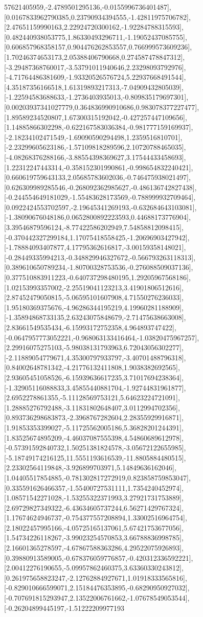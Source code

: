\documentclass{article}
\begin{document}
57621405959,-2.4789501295136,-0.0155996736401487],[0.0167833962790385,0.23790934394555,-1.42811975706782],[2.47651159990163,2.22924720300162,-1.92284788315593],[0.482440938053775,1.86330493296711,-1.19052437085755],[0.606857968358157,0.904476262853557,0.766999573609236],[1.70246374653173,2.05388406790668,0.274587478847312],[-3.29487368760017,-3.53791011940646,2.23298093792976],[-4.71764486381609,-1.93320526576724,5.22937668491544],[4.35187356166518,1.61319893217313,-7.04909432805039],[-1.22594583688633,-1.2736403935013,-0.809835179697301],[0.00203937341027779,0.364836990910686,0.983078377227477],[1.89589234520807,1.67300315192042,-0.427257447109656],[1.14885866302298,-0.622167583036384,-0.981777159169937],[-2.18234102471549,-1.69090590294498,1.2359516810701],[-2.23299605623186,-1.57109818289596,2.10720788465035],[-4.08268376288166,-3.88554398369627,3.17544433458693],[1.22312247443314,-0.358152301990861,-0.998654832240421],[0.660619759643133,2.05685783602036,-0.746475938021497],[0.626309989285546,-0.268092362985627,-0.486136742827438],[-0.244554649181029,-1.55483628173569,-0.788999932709464],[0.0922424553702597,-2.19645341269193,-0.632684643103081],[-1.38090676048186,0.0652800892223593,0.44688173776904],[3.39546879596124,-8.77422586202949,7.54858812098415],[-0.370442327299184,1.17075418558425,-1.20696903427942],[-1.78884093407877,4.17795362616817,-3.00159358148021],[-0.28449335994213,-0.348829946327672,-0.566793263118313],[0.389610650789234,-1.80700328753536,-0.276088509037136],[0.377510883911223,-0.640737298480195,1.29205967568186],[1.02153993357002,-2.25519041123213,3.41901806512616],[2.87452479050815,-5.06595101607908,4.71550276236033],[1.95180369375676,-4.96286344195219,4.19960281188909],[-1.35894868733135,2.63243075848679,-2.71475638663008],[2.83661549535434,-6.15993172752358,4.964893747422],[-0.0647957773052221,-0.968063133416464,-1.03820475967257],[2.29916075275103,-5.98038131793963,6.72043056302277],[-2.11889054779671,4.35300797933797,-3.40701488796318],[0.84002648781342,-4.21776132411808,1.9038382692565],[2.93605451058526,-6.15939636617235,3.71017694238364],[-1.32905116088833,3.45855440881704,-1.92744831961877],[2.6952278861355,-5.11128569753121,5.64623224721091],[1.28885276792488,-3.11831802648407,3.0112994702356],[0.893736298683873,-2.3968767282604,2.28355929916871],[1.91853353399027,-5.11725562005186,5.36828201244391],[1.83525674895209,-4.46037087555398,4.54860689612978],[-0.57391592840732,1.50251381824578,-3.05672122655985],[-5.18749174216125,11.5551193616539,-11.8805884480515],[2.23302564119848,-3.926899703971,5.14849636162046],[1.04405517854885,-0.781302817272919,0.823858759853047],[0.335591626466357,-1.55400727531111,1.7354240452974],[1.08571542271028,-1.53255322371993,3.27921731753889],[2.69729827349322,-6.43634605737244,6.56271429767324],[1.17674624946737,-0.754377557208894,1.33002516964754],[2.18022457995166,-4.05725165137061,5.67421753677056],[1.54734226118267,-3.99023254570853,3.66788836998785],[2.16601365278597,-4.67867588363286,4.29522075926893],[0.39880913589005,-0.678376059776857,-0.420312336592221],[2.00412276190655,-5.09957862460375,3.63360330243812],[0.261975658823247,-2.12762884927671,1.01918333565816],[-0.829010666599071,2.15184476353895,-0.68290950927032],[-0.707691815293947,2.13522006761662,-1.07678549053544],[-0.26204899445197,-1.51222209977193
\end{document}
